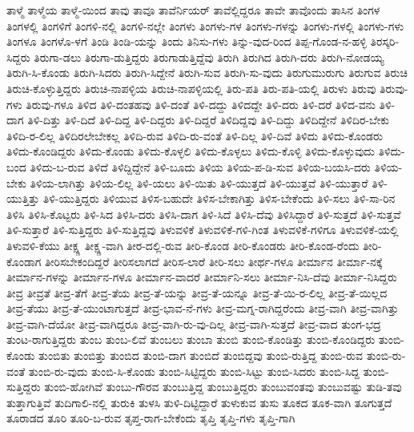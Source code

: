 {ತಾಳ್ಮೆ
ತಾಳ್ಮೆಯ
ತಾಳ್ಮೆ-ಯಿಂದ
ತಾವು
ತಾವೂ
ತಾವೆರ್ನಿಯರ್
ತಾವೆಲ್ಲಿದ್ದರೂ
ತಾವೇ
ತಾವೊಂದು
ತಾಸಿನ
ತಿಂಗಳ
ತಿಂಗಳಲ್ಲಿ
ತಿಂಗಳಿಗೆ
ತಿಂಗಳಿ-ನಲ್ಲಿ
ತಿಂಗಳಿ-ನಲ್ಲೇ
ತಿಂಗಳು
ತಿಂಗಳು-ಗಳ
ತಿಂಗಳು-ಗಳನ್ನು
ತಿಂಗಳು-ಗಳಲ್ಲಿ
ತಿಂಗಳು-ಗಳು
ತಿಂಗಳೂ
ತಿಂಗಳೊ-ಳಗೆ
ತಿಂಡಿ
ತಿಂಡಿ-ಯನ್ನು
ತಿಂದು
ತಿನಿಸು-ಗಳು
ತಿನ್ನು-ವುದ-ರಿಂದ
ತಿಪ್ಪ-ಗೊಂಡ-ನ-ಹಳ್ಳಿ
ತಿರಸ್ಕರಿ-ಸಿದ್ದರು
ತಿರುಗಾ-ಡಲು
ತಿರುಗಾ-ಡುತ್ತಿದ್ದರು
ತಿರುಗಾಡುತ್ತಿದ್ದೆವು
ತಿರುಗಿ
ತಿರುಗಿದ
ತಿರುಗಿ-ದರು
ತಿರುಗಿ-ನೋಡಯ್ಯ
ತಿರುಗಿ-ಸಿ-ಕೊಂಡು
ತಿರುಗಿ-ಸಿದರು
ತಿರುಗಿ-ಸಿದ್ದೇನೆ
ತಿರುಗಿ-ಸುವ
ತಿರುಗಿ-ಸು-ವುದು
ತಿರುಗುಮುರುಗು
ತಿರುಗುವ
ತಿರುಚಿ
ತಿರುಚಿ-ಕೊಳ್ಳುತ್ತಿದ್ದರು
ತಿರುಚಿ-ನಾಪಳ್ಳಿಯ
ತಿರುಚಿ-ನಾಪಳ್ಳಿಯಲ್ಲಿ
ತಿರು-ಪತಿ
ತಿರು-ಪತಿ-ಯಲ್ಲಿ
ತಿರುಳು
ತಿರುವು
ತಿರುವು-ಗಳು
ತಿರುವು-ಗಳೂ
ತಿಳಿದ
ತಿಳಿ-ದಂತಹವು
ತಿಳಿ-ದಂತೆ
ತಿಳಿ-ದದ್ದು
ತಿಳಿದದ್ದೇ
ತಿಳಿ-ದರು
ತಿಳಿ-ದರೆ
ತಿಳಿದ-ವನು
ತಿಳಿ-ದಾಗ
ತಿಳಿ-ದಿತ್ತು
ತಿಳಿ-ದಿದೆ
ತಿಳಿ-ದಿದ್ದ
ತಿಳಿ-ದಿದ್ದರು
ತಿಳಿ-ದಿದ್ದರೆ
ತಿಳಿದಿದ್ದವು
ತಿಳಿ-ದಿದ್ದು
ತಿಳಿದಿದ್ದೇನೆ
ತಿಳಿದಿರ-ಬೇಕು
ತಿಳಿದಿ-ರ-ಲಿಲ್ಲ
ತಿಳಿದಿರಲೇಬೇಕಲ್ಲ
ತಿಳಿದಿ-ರುವ
ತಿಳಿದಿ-ರು-ವಂತೆ
ತಿಳಿ-ದಿಲ್ಲ
ತಿಳಿ-ದಿವೆ
ತಿಳಿದು
ತಿಳಿದು-ಕೊಂಡರು
ತಿಳಿದು-ಕೊಂಡಿದ್ದರು
ತಿಳಿದು-ಕೊಂಡು
ತಿಳಿದು-ಕೊಳ್ಳಲಿ
ತಿಳಿದು-ಕೊಳ್ಳಲು
ತಿಳಿದು-ಕೊಳ್ಳಿ
ತಿಳಿದು-ಕೊಳ್ಳುವುದು
ತಿಳಿದು-ಬಂದ
ತಿಳಿದು-ಬ-ರುವ
ತಿಳಿದೆ
ತಿಳಿದ್ದಿದ್ದೇನೆ
ತಿಳಿ-ಬೂದು
ತಿಳಿಯ
ತಿಳಿಯ-ಪ-ಡಿ-ಸುವ
ತಿಳಿಯ-ಬಯಸಿ-ದರು
ತಿಳಿಯ-ಬೇಕು
ತಿಳಿಯ-ಲಾಗಿತ್ತು
ತಿಳಿಯ-ಲಿಲ್ಲ
ತಿಳಿ-ಯಲು
ತಿಳಿ-ಯಿತು
ತಿಳಿ-ಯುತ್ತದೆ
ತಿಳಿ-ಯುತ್ತವೆ
ತಿಳಿ-ಯುತ್ತಾರೆ
ತಿಳಿ-ಯುತ್ತಿತ್ತು
ತಿಳಿ-ಯುತ್ತಿದ್ದರು
ತಿಳಿಯುವ
ತಿಳಿಸ-ಬಹುದೇ
ತಿಳಿಸ-ಬೇಕಾಗಿತ್ತು
ತಿಳಿಸ-ಬೇಕೆಂದು
ತಿಳಿ-ಸಲು
ತಿಳಿ-ಸಾ-ರಿನ
ತಿಳಿಸಿ
ತಿಳಿಸಿ-ಕೊಟ್ಟರು
ತಿಳಿ-ಸಿದ
ತಿಳಿಸಿ-ದರು
ತಿಳಿಸಿ-ದಾಗ
ತಿಳಿ-ಸಿದೆ
ತಿಳಿಸಿ-ದೆವು
ತಿಳಿಸಿದ್ದಾರೆ
ತಿಳಿ-ಸುತ್ತದೆ
ತಿಳಿ-ಸುತ್ತವೆ
ತಿಳಿ-ಸುತ್ತಾರೆ
ತಿಳಿ-ಸುತ್ತಿದ್ದರು
ತಿಳಿ-ಸುತ್ತಿದ್ದವು
ತಿಳುವಳಿಕೆ
ತಿಳುವಳಿಕೆ-ಗಳಿ-ಗಿಂತ
ತಿಳುವಳಿಕೆ-ಗಳಿಗೂ
ತಿಳುವಳಿಕೆ-ಯಲ್ಲಿ
ತಿಳುವಳಿ-ಕೆಯು
ತೀಕ್ಷ್ಣ
ತೀಕ್ಷ್ಣ-ವಾಗಿ
ತೀರ-ದಲ್ಲಿ-ರುವ
ತೀರಿ-ಕೊಂಡ
ತೀರಿ-ಕೊಂಡರು
ತೀರಿ-ಕೊಂಡ-ರೆಂದು
ತೀರಿ-ಕೊಂಡಾಗ
ತೀರಿಸಬೇಕಂದಿದ್ದರೆ
ತೀರಿಸಲಾಗದೆ
ತೀರಿಸ-ಲಾರೆ
ತೀರಿ-ಸಲು
ತೀರ್ಥ-ಗಳೂ
ತೀರ್ಮಾನ
ತೀರ್ಮಾ-ನಕ್ಕೆ
ತೀರ್ಮಾನ-ಗಳನ್ನು
ತೀರ್ಮಾನ-ಗಳೂ
ತೀರ್ಮಾನ-ವಾದರೆ
ತೀರ್ಮಾನಿ-ಸಲು
ತೀರ್ಮಾ-ನಿಸಿ-ದೆವು
ತೀರ್ಮಾ-ನಿಸಿದ್ದರು
ತೀವ್ರ
ತೀವ್ರತೆ
ತೀವ್ರ-ತೆಗೆ
ತೀವ್ರ-ತೆಯ
ತೀವ್ರ-ತೆ-ಯನ್ನು
ತೀವ್ರ-ತೆ-ಯನ್ನೂ
ತೀವ್ರ-ತೆ-ಯಿ-ರ-ಲಿಲ್ಲ
ತೀವ್ರ-ತೆ-ಯಿಲ್ಲದ
ತೀವ್ರ-ತೆಯು
ತೀವ್ರ-ತೆ-ಯುಂಟಾಗುತ್ತದೆ
ತೀವ್ರ-ಭಾವ-ನೆ-ಗಳು
ತೀವ್ರ-ಮಗ್ನ-ರಾಗಿದ್ದರೆಂದು
ತೀವ್ರ-ವಾಗಿ
ತೀವ್ರ-ವಾಗಿತ್ತು
ತೀವ್ರ-ವಾಗಿ-ದೆಯೋ
ತೀವ್ರ-ವಾಗಿದ್ದರೂ
ತೀವ್ರ-ವಾಗಿ-ರು-ವು-ದಿಲ್ಲ
ತೀವ್ರ-ವಾಗಿ-ಸುತ್ತದೆ
ತೀವ್ರ-ವಾದ
ತುಂಗ-ಭದ್ರ
ತುಂಟ-ರಾಗುತ್ತಿದ್ದರು
ತುಂಬ
ತುಂಬ-ಲಿವೆ
ತುಂಬಲು
ತುಂಬಾ
ತುಂಬಿ
ತುಂಬಿ-ಕೊಂಡಿತ್ತು
ತುಂಬಿ-ಕೊಂಡಿದ್ದರು
ತುಂಬಿ-ಕೊಂಡು
ತುಂಬಿತು
ತುಂಬಿತ್ತು
ತುಂಬಿದ
ತುಂಬಿ-ದಾಗ
ತುಂಬಿದೆ
ತುಂಬಿದ್ದವು
ತುಂಬಿ-ರುತ್ತಿದ್ದ
ತುಂಬಿ-ರುವ
ತುಂಬಿ-ರು-ವಂತೆ
ತುಂಬಿ-ರು-ವುದು
ತುಂಬಿ-ಸಿ-ಕೊಂಡು
ತುಂಬಿ-ಸಿಟ್ಟಿದ್ದರು
ತುಂಬಿ-ಸಿಟ್ಟು
ತುಂಬಿ-ಸಿದರು
ತುಂಬಿ-ಸಿದ್ದ
ತುಂಬಿ-ಸುತ್ತಿದ್ದರು
ತುಂಬಿ-ಹೋಗಿವೆ
ತುಂಬು-ಗೌರವ
ತುಂಬುತ್ತಿದ್ದ
ತುಂಬುತ್ತಿದ್ದರು
ತುಂಬುವಂತವು
ತುಂಬುವಷ್ಟು
ತುಡಿ-ತವು
ತುತ್ತಾಗುತ್ತಿವೆ
ತುದಿಗಾಲಿ-ನಲ್ಲಿ
ತುರುಕಿ
ತುಳಸಿ
ತುಳಿ-ದಿಟ್ಟಿದ್ದಾರೆ
ತುಳುಕುವ
ತುಸು
ತೂಕದ
ತೂಕ-ವಾಗಿ
ತೂಗುತ್ತದೆ
ತೂರಾಡದ
ತೂರಿ
ತೂರಿ-ಬ-ರುವ
ತೃಪ್ತ-ರಾಗ-ಬೇಕೆಂದು
ತೃಪ್ತಿ
ತೃಪ್ತಿ-ಗಳು
ತೃಪ್ತಿ-ಗಾಗಿ
}
